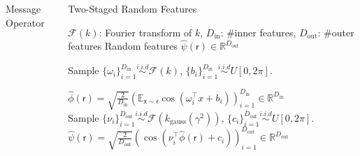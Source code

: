 \documentclass[english]{beamer}
\begin{document}
\begin{frame}
\begin{columns}[t]
\begin{block}{Message Operator }
\end{block}


\begin{block}{Two-Staged Random Features }
\begin{algorithmic}[1]
\REQUIRE 
$\mathscr{F}(k)$: Fourier transform of $k$, $D_\mathrm{in}$: \#inner features, 
$D_\mathrm{out}$: \#outer features 
\ENSURE Random features $\hat{\psi}(\mathsf{r}) \in \mathbb{R}^{D_\mathrm{out}}$

\STATE Sample  $\{ \omega_i \}_{i=1}^{D_\mathrm{in}} \overset{i.i.d}{\sim} \mathscr{F}(k)$, 
\hspace{10mm} $\{b_i\}_{i=1}^{D_\mathrm{in}} \overset{i.i.d}{\sim} U[0, 2\pi] $.

\STATE $\hat{\phi}(\mathsf{r}) = \sqrt{\frac{2}{D_\mathrm{in}}} \left(
\mathbb{E}_{\mathsf{x \sim \mathsf{r}}} 
\cos(\omega_{i}^{\top}x+b_{i} ) \right)_{i=1}^{D_\mathrm{in}} \in \mathbb{R}^{D_\mathrm{in}}$ \\
%
%
\STATE Sample $\{ \nu_i \}_{i=1}^{D_\mathrm{out}} \overset{i.i.d}{\sim}
\mathscr{F}({k}_{\text{gauss}}(\gamma^{2}))$, \hspace{10mm} 
$\{c_i\}_{i=1}^{D_\mathrm{out}} \overset{i.i.d}{\sim} U[0, 2\pi] $.
\STATE $\hat{\psi}(\mathsf{r}) = \sqrt{\frac{2}{D_\mathrm{out}}} \left(  
\cos(\nu_{i}^{\top} \hat{\phi}(\mathsf{r}) + c_{i} ) \right)_{i=1}^{D_\mathrm{out}} \in 
\mathbb{R}^{D_\mathrm{out}}$
\end{algorithmic}


\end{block}
\end{columns}
\end{frame}
\end{document}
